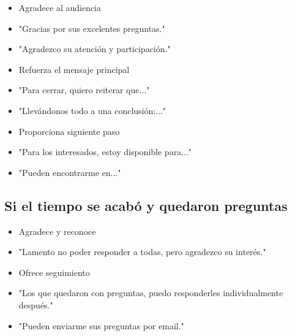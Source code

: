 \documentclass[a4paper,11pt]{article}
\begin{document}
\begin{itemize}

  \item Agradece al audiencia

  \item "Gracias por sus excelentes preguntas."

  \item "Agradezco su atención y participación."

  \item Refuerza el mensaje principal

  \item "Para cerrar, quiero reiterar que..."

  \item "Llevándonos todo a una conclusión:..."

  \item Proporciona siguiente paso

  \item "Para los interesados, estoy disponible para..."

  \item "Pueden encontrarme en..."

\end{itemize}

\vspace{0.2cm}

\subsection{Si el tiempo se acabó y quedaron preguntas}

\begin{itemize}

  \item Agradece y reconoce

  \item "Lamento no poder responder a todas, pero agradezco su interés."

  \item Ofrece seguimiento

  \item "Los que quedaron con preguntas, puedo responderles individualmente después."

  \item "Pueden enviarme sus preguntas por email."

\end{itemize}

\vspace{0.2cm}
\end{document}
